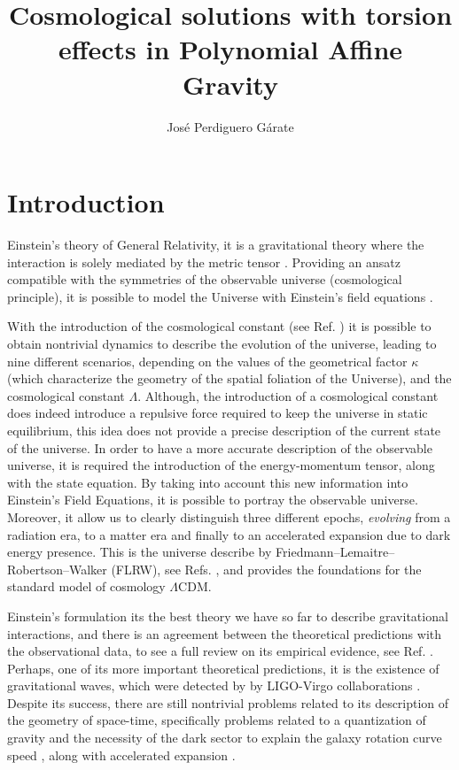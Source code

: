 \documentclass{article}
\title{Cosmological solutions with torsion effects in Polynomial Affine Gravity}
\author{Jos\'e Perdiguero G\'arate}
\begin{document}
\maketitle

\section{Introduction}
\label{sec:Introduction}

Einstein's theory of General Relativity, it is a gravitational theory where the interaction is solely mediated by the 
metric tensor \cite{Einstein_GR,Einstein_GR_Bases}. Providing an ansatz compatible 
with the symmetries of the observable universe (cosmological principle), it is possible to model the Universe with Einstein's
field equations \cite{Einstein_GR_Feqs}.

With the introduction of the cosmological constant (see Ref. \cite{Einstein_Cosmological_Constant}) it is possible to obtain nontrivial dynamics to 
describe the evolution of the universe, leading to nine different scenarios, depending on the values of the geometrical factor $\kappa$ (which characterize
the geometry of the spatial foliation of the Universe), and the cosmological constant $\Lambda$. Although, the introduction of a 
cosmological constant does indeed introduce a repulsive force required to keep the universe in static equilibrium, this idea 
does not provide a precise description of the current state of the universe. In order to have a more accurate description of the observable universe,
it is required the introduction of the energy-momentum tensor, along with the state equation. By taking into account this new information into 
Einstein's Field Equations, it is possible to portray the observable universe. Moreover, it allow us to clearly distinguish three different 
epochs, \textit{evolving} from a radiation era, to a matter era and finally to an accelerated expansion due to dark energy presence. This is the 
universe describe by Friedmann–Lemaitre–Robertson–Walker (FLRW), see Refs. \cite{Frie,Friedmann,Lema,Lema_Expansion,Robertson_1,Robertson_2,Robertson_3}, 
and provides the foundations for the standard model of cosmology $\Lambda$CDM.

Einstein's formulation its the best theory we have so far to describe gravitational interactions, and there is an agreement between the theoretical
predictions with the observational data, to see a full review on its empirical evidence, see Ref. \cite{Will_2014,will_2018}. Perhaps, one of its more
important theoretical predictions, it is the existence of gravitational waves, which were detected by by LIGO-Virgo collaborations \cite{Abbott_2016,Abbott_2017}.
Despite its success, there are still nontrivial problems related to its description of the geometry of space-time, specifically problems related 
to a quantization of gravity \cite{PhysRev.160.1113,PhysRev.162.1195,PhysRevD.10.401,PhysRevD.10.411} and 
the necessity of the dark sector to explain the galaxy rotation curve speed \cite{Rotation_Curve,Rotation_Curve_2}, along with accelerated expansion \cite{Riess_1998}.
\end{document}
